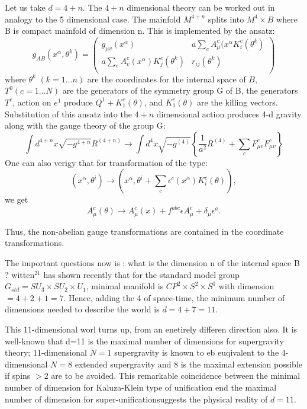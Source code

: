 Let us take $d=4 + n$. The $4 + n$ dimensional theory can be worked out in analogy to the 5 dimensional case. The mainfold $M^{4 + n}$ splits into $M^{4} \times B$ where B is compact mainfold of dimension n. This is implemented by the ansatz:
\begin{equation*}
g_{AB} (x^{\alpha}, \theta^{k}) = \left(
\begin{array}{c|c}
g_{\mu v} (x^{\alpha}) & a \sum_{c} A_{\mu}^{c} (x^{\alpha} K^{c}_{i} (\theta^{k})\\[0.2cm]
\hline
a\sum_{c}A_{v}^{c} (x^{\alpha}) K_{j}^{c}(\theta^{k}) & r_{ij}(\theta^{k})\\[0.2cm]
\end{array}
\right)
\end{equation*}
where $\theta^{k}$ $(k= 1\ldots n)$ are the coordinates for the internal space of $B$,$T^{0} (c = 1 \ldots N)$ are the generators of the symmetry group G of B, the generators $T^{c}$, action on $e^{1}$ produce $Q^{1} + K^{c}_{1}(\theta)$, and $K^{c}_{1}(\theta)$ are the killing vectors. Substitution of this ansatz into the $4+ n $ dimensional action produces 4-d gravity along with the gauge theory of the group G:
$$
\int d^{4 + n} x \sqrt{-g^{4+ n}} R^(4 + n) \rightarrow \int d^{4}x \sqrt{-g^{(4)}} \left\{\frac{1}{a^{2}}R^{(4)} + \sum_{c}F^{c}_{\mu v} F^{c}_{\mu v} \right\}
$$
One can also verigy that for transformation of the type:
$$
(x^{\alpha}, \theta^{i}) \rightarrow (x^{\alpha}, \theta^{i} + \sum_{c} \epsilon^{c} (x^{\alpha}) K^{c}_{i}(\theta)),
$$
we get
$$
A_{\mu}^{c} (\theta) \rightarrow A^{c}_{\mu} (x) + f^{abc} \epsilon A_{\mu}^{c} + \delta_{\mu} \epsilon^{a}.
$$

Thus, the non-abelian gauge transformations are contained in the coordinate transformations.

The important questions now is : what is the dimension n of the internal space B ? witten$^{21}$ has shown recently that for the standard model group $G_{std} = SU_{3} \times SU_{2} \times U_{1}$, minimal manifold is $CP^{2} \times S^{2} \times S^{1} $ with dimension $=4 + 2+ 1 = 7$. Hence, adding the 4 of space-time, the minimum number of dimensions needed to describe the world is $d= 4 + 7 =11$.

This 11-dimensional worl turns up, from an enetirely differen direction also. It is well-known that d=11 is the maximal number of dimensions for supergravity theory; 11-dimensional $N=1$ supergravity is known to eb euqivalent to the 4-dimensional $N=8$ extended supergravity and 8 is the maximal extension possible if spins $> 2$ are to be avoided. This remarkable coincidence between the minimal number of dimension for Kaluza-Klein type of unification end the maximal number of dimension for super-unificationsuggests the physical reality of $d=11$.

